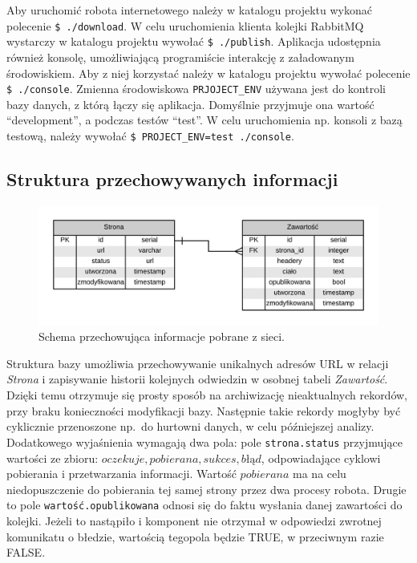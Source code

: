 Aby uruchomić robota internetowego należy w katalogu projektu wykonać polecenie
\texttt{\$ ./download}. W celu uruchomienia klienta kolejki RabbitMQ wystarczy w katalogu projektu wywołać \texttt{\$ ./publish}.
Aplikacja udostępnia również konsolę, umożliwiającą programiście interakcję z załadowanym środowiskiem. Aby z niej korzystać należy w katalogu projektu wywołać polecenie
\texttt{\$ ./console}. 
Zmienna środowiskowa \texttt{PRJOJECT\_ENV} używana jest do kontroli bazy danych, z którą łączy się aplikacja. Domyślnie przyjmuje ona wartość ``development'', a podczas testów
``test''. W celu uruchomienia np. konsoli z bazą testową, należy wywołać \texttt{\$ PROJECT\_ENV=test ./console}.

\subsection{Struktura przechowywanych informacji}
\label{subs:struktMri}

\begin{figure}[!h]
    \centering
    \label{graph:mri_schema}
    \includegraphics[width=\textwidth]{mri_schema}
    \caption{Schema przechowująca informacje pobrane z sieci.}
\end{figure}

Struktura bazy umożliwia przechowywanie unikalnych adresów URL w relacji \emph{Strona} i zapisywanie historii kolejnych odwiedzin w osobnej tabeli \emph{Zawartość}. Dzięki
temu otrzymuje się prosty sposób na archiwizację nieaktualnych rekordów, przy braku konieczności modyfikacji bazy. Następnie takie rekordy mogłyby być cyklicznie przenoszone 
np.~do hurtowni danych, w celu późniejszej analizy. Dodatkowego wyjaśnienia wymagają dwa pola: pole \texttt{strona.status} przyjmujące wartości ze zbioru: 
${oczekuje, pobierana, sukces, błąd}$, odpowiadające cyklowi pobierania i przetwarzania informacji. Wartość $pobierana$ ma na celu niedopuszczenie do pobierania tej samej
strony przez dwa procesy robota. Drugie to pole \texttt{wartość.opublikowana} odnosi się do faktu wysłania danej zawartości do kolejki. Jeżeli to nastąpiło i komponent nie otrzymał
w odpowiedzi zwrotnej komunikatu o błedzie, wartością tegopola będzie TRUE, w przeciwnym razie FALSE.


